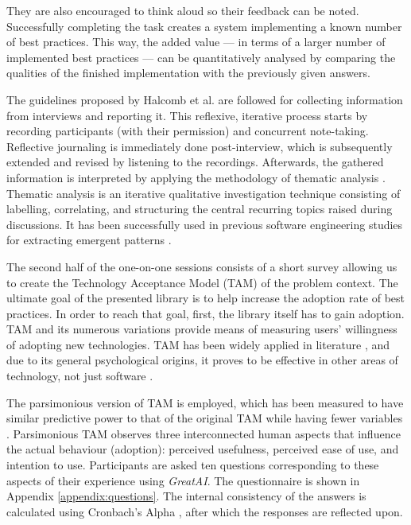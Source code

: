 They are also encouraged to think aloud so their feedback can be noted. Successfully completing the task creates a system implementing a known number of best practices. This way, the added value --- in terms of a larger number of implemented best practices --- can be quantitatively analysed by comparing the qualities of the finished implementation with the previously given answers. 
 
The guidelines proposed by Halcomb et al. \cite{halcomb2006verbatim} are followed for collecting information from interviews and reporting it. This reflexive, iterative process starts by recording participants (with their permission) and concurrent note-taking. Reflective journaling is immediately done post-interview, which is subsequently extended and revised by listening to the recordings. Afterwards, the gathered information is interpreted by applying the methodology of thematic analysis \cite{alhojailan2012thematic}. Thematic analysis is an iterative qualitative investigation technique consisting of labelling, correlating, and structuring the central recurring topics raised during discussions. It has been successfully used in previous software engineering studies for extracting emergent patterns \cite{haakman2021ai,cruz2019catalog}. 

The second half of the one-on-one sessions consists of a short survey allowing us to create the Technology Acceptance Model (TAM) \cite{davis1989perceived} of the problem context. The ultimate goal of the presented library is to help increase the adoption rate of best practices. In order to reach that goal, first, the library itself has to gain adoption. TAM and its numerous variations provide means of measuring users' willingness of adopting new technologies. TAM has been widely applied in literature \cite{marangunic2015technology}, and due to its general psychological origins, it proves to be effective in other areas of technology, not just software \cite{riemenschneider2002explaining}. 

The parsimonious version of TAM is employed, which has been measured to have similar predictive power to that of the original TAM while having fewer variables \cite{wu2011user}. Parsimonious TAM observes three interconnected human aspects that influence the actual behaviour (adoption): perceived usefulness, perceived ease of use, and intention to use. Participants are asked ten questions corresponding to these aspects of their experience using \textit{GreatAI}. The questionnaire is shown in Appendix \ref{appendix:questions}. The internal consistency of the answers is calculated using Cronbach's Alpha \cite{bland1997statistics}, after which the responses are reflected upon.
